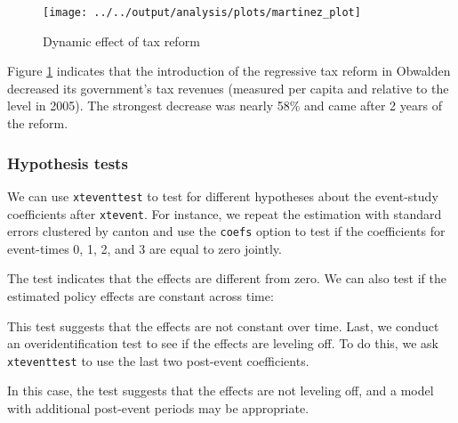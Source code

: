 \documentclass[bib]{./sty/statapress}
\begin{document}
\begin{figure}[h!]
\begin{center}
\texttt{[image: ../../output/analysis/plots/martinez\_plot]}
\end{center}
\caption{Dynamic effect of tax reform}
\label{fig:martinez_default}
\end{figure}

Figure \ref{fig:martinez_default} indicates that the introduction of the regressive tax reform in Obwalden decreased its government's tax revenues (measured per capita and relative to the level in 2005). The strongest decrease was nearly 58\% and came after 2 years of the reform.

\subsubsection*{Hypothesis tests}

We can use \texttt{xteventtest} to test for different hypotheses about the event-study coefficients after \texttt{xtevent}.
For instance, we repeat the estimation with standard errors clustered by canton and use the \texttt{coefs} option to test if the coefficients for event-times 0, 1, 2, and 3 are equal to zero jointly.

\begin{stlog}
\nullskip
\end{stlog}
The test indicates that the effects are different from zero.
We can also test if the estimated policy effects are constant across time:

\begin{stlog}
\nullskip
\end{stlog}

This test suggests that the effects are not constant over time.
Last, we conduct an overidentification test to see if the effects are leveling off.
To do this, we ask \texttt{xteventtest} to use the last two post-event coefficients.

\begin{stlog}
\nullskip
\end{stlog}

In this case, the test suggests that the effects are not leveling off, and a model with additional post-event periods may be appropriate.

\end{document}
